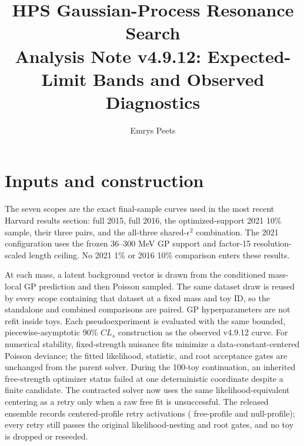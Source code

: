 \documentclass[11pt]{article}
\title{HPS Gaussian-Process Resonance Search\\
Analysis Note v4.9.12: Expected-Limit Bands and Observed Diagnostics}
\author{Emrys Peets}
\date{\StageDate}
\newcommand{\eps}{\ensuremath{\epsilon}}
\newcommand{\CLs}{\ensuremath{CL_s}}
\begin{document}
\maketitle

\begin{center}
\end{center}

\section{Inputs and construction}

The seven scopes are the exact final-sample curves used in the most recent
Harvard results section: full 2015, full 2016, the optimized-support 2021 10\%
sample, their three pairs, and the all-three shared-$\eps^2$ combination. The
2021 configuration uses the frozen 36--300 MeV GP support and factor-15
resolution-scaled length ceiling. No 2021 1\% or 2016 10\% comparison enters
these results.

At each mass, a latent background vector is drawn from the conditioned
mass-local GP prediction and then Poisson sampled. The same dataset draw is
reused by every scope containing that dataset at a fixed mass and toy ID, so
the standalone and combined comparisons are paired. GP hyperparameters are not
refit inside toys. Each pseudoexperiment is evaluated with the same bounded,
piecewise-asymptotic 90\% \CLs{} construction as the observed v4.9.12 curve.
For numerical stability, fixed-strength nuisance fits minimize a
data-constant-centered Poisson deviance; the fitted likelihood, statistic, and
root acceptance gates are unchanged from the parent solver. During the 100-toy
continuation, an inherited free-strength optimizer status failed at one
deterministic coordinate despite a finite candidate. The contracted solver now
uses the same likelihood-equivalent centering as a retry only when a raw free fit
is unsuccessful. The released ensemble records \CenteredProfileRetries{} centered-profile
retry activations (\FreeProfileRetries{} free-profile and \NullProfileRetries{} null-profile);
every retry still passes the original likelihood-nesting and root gates, and no toy is dropped
or reseeded.
\end{document}
